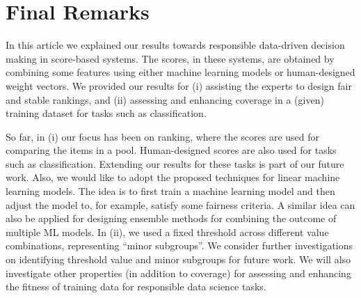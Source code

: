 \documentclass[11pt]{article}
\begin{document}



\vspace{-3mm}\section{Final Remarks}\label{sec:conclusion}
In this article we explained our results towards responsible data-driven decision making in score-based systems.
The scores, in these systems, are obtained by combining some features using either machine learning models or human-designed weight vectors.
We provided our results for (i) assisting the experts to design fair and stable rankings, and (ii) assessing and enhancing coverage in a (given) training dataset for tasks such as classification.

So far, in (i) our focus has been on ranking, where the scores are used for comparing the items in a pool. Human-designed scores are also used for tasks such as classification.
Extending our results for these tasks is part of our future work.
Also, we would like to adopt the proposed techniques for linear machine learning models.
The idea is to first train a machine learning model and then adjust the model to, for example, satisfy some fairness criteria. A similar idea can also be applied for designing ensemble methods for combining the outcome of multiple ML models.
In (ii), we used a fixed threshold across different value combinations, representing ``minor subgroups''.
We consider further investigations on identifying threshold value and minor subgroups for future work.
We will also investigate other properties (in addition to coverage) for assessing and enhancing the fitness of training data for responsible data science tasks.




% 
% 
\end{document}

